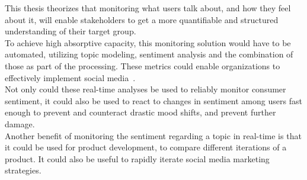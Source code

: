 This thesis theorizes that monitoring what users talk about,
and how they feel about it, will enable stakeholders to get a more quantifiable and structured understanding of their target group.
\\
To achieve high absorptive capacity, this monitoring solution would have to be automated,
utilizing topic modeling, sentiment analysis and the combination of those as part of the processing.
These metrics could enable organizations to effectively implement social media~\cite{Culnan2015}.
\\
Not only could these real-time analyses be used to reliably monitor consumer sentiment,
it could also be used to react to changes in sentiment among users fast enough to prevent and counteract
drastic mood shifts, and prevent further damage.
\\
Another benefit of monitoring the sentiment regarding a topic in real-time is that it could be used for product development,
to compare different iterations of a product.
It could also be useful to rapidly iterate social media marketing strategies.